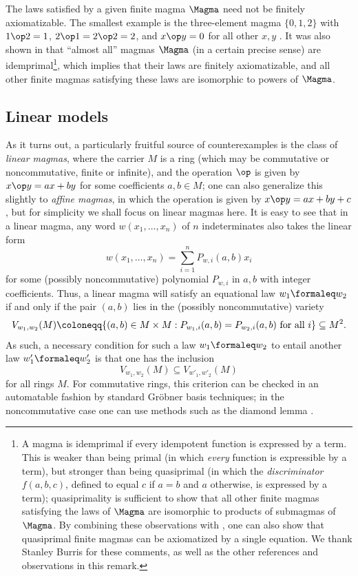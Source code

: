 \begin{remark} The laws satisfied by a given finite magma $\Magma$ need not be finitely axiomatizable.  The smallest example is the three-element magma $\{0,1,2\}$ with $1 \op 2 = 1$, $2 \op 1 = 2 \op 2 = 2$, and $x \op y = 0$ for all other $x,y$ \cite{murskii-1}.  It was also shown in \cite{murskii-2} that ``almost all'' magmas $\Magma$ (in a certain precise sense) are idemprimal\footnote{A magma is idemprimal if every idempotent function is expressed by a term.  This is weaker than being primal (in which \emph{every} function is expressible by a term), but stronger than being quasiprimal (in which the \emph{discriminator} $f(a,b,c)$, defined to equal $c$ if $a=b$ and $a$ otherwise, is expressed by a term); quasiprimality is sufficient to show that all other finite magmas satisfying the laws of $\Magma$ are isomorphic to products of submagmas of $\Magma$.  By combining these observations with \cite{Padmanabhan}, one can also show that quasiprimal finite magmas can be axiomatized by a single equation.  We thank Stanley Burris for these comments, as well as the other references and observations in this remark.}, which implies that their laws are finitely axiomatizable, and all other finite magmas satisfying these laws are isomorphic to powers of $\Magma$.
\end{remark}

\subsection{Linear models}\label{linear-sec}

As it turns out, a particularly fruitful source of counterexamples is the class of \emph{linear magmas}, where the carrier $M$ is a ring (which may be commutative or noncommutative, finite or infinite), and the operation $\op$ is given by $x \op y = ax + by$ for some coefficients $a,b \in M$; one can also generalize this slightly to \emph{affine magmas}, in which the operation is given by $x \op y = ax + by + c$, but for simplicity we shall focus on linear magmas here.  It is easy to see that in a linear magma, any word $w(x_1,\dots,x_n)$ of $n$ indeterminates also takes the linear form
$$ w(x_1,\dots,x_n) = \sum_{i=1}^n P_{w,i}(a,b) x_i$$
for some (possibly noncommutative) polynomial $P_{w,i}$ in $a,b$ with integer coefficients.  Thus, a linear magma will satisfy an equational law $w_1 \formaleq w_2$ if and only if the pair $(a,b)$ lies in the (possibly noncommutative) variety
\begin{equation}\label{variety}
  V_{w_1,w_2}(M) \coloneqq \{ (a,b) \in M \times M: P_{w_1,i}(a,b) = P_{w_2,i}(a,b) \hbox{ for all } i \} \subseteq M^2.
\end{equation}
As such, a necessary condition for such a law $w_1 \formaleq w_2$ to entail another law $w'_1 \formaleq w'_2$ is that one has the inclusion
$$ V_{w_1,w_2}(M) \subseteq V_{w'_1,w'_2}(M)
$$
for all rings $M$.  For commutative rings, this criterion can be checked in an automatable fashion by standard Gr\"obner basis techniques; in the noncommutative case one can use methods such as the diamond lemma \cite{diamond-lemma}.

